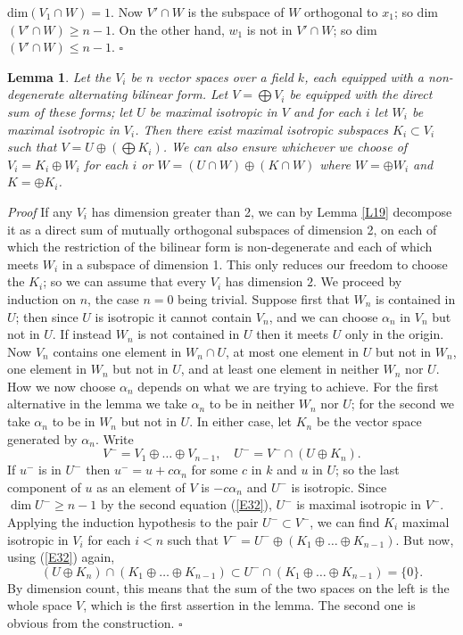 \documentclass[12pt]{article}
\def\ga{{\alpha}}
\def\qed{{\hfill$\square$}}
\def\beq{\begin{equation} \label}
\def\ble{\begin{lemma} \label}
\def\ele{\end{lemma}}
\newtheorem{lemma}{Lemma}
\begin{document}
dim$(V_1\cap W)=1$. Now $V'\cap W$ is the subspace of $W$ orthogonal to $x_1$;
so dim$(V'\cap W)\geq n-1$. On the other hand, $w_1$ is not in $V'\cap W$; so
dim$(V'\cap W)\leq n-1$.  \qed
\ble{L10} Let the $V_i$ be $n$ vector spaces over a field $k$, each equipped
with a non-degenerate alternating bilinear form. Let $V=\bigoplus V_i$ be
equipped with the direct sum of these forms; let $U$ be maximal isotropic in
$V$ and for each $i$ let $W_i$ be maximal isotropic in $V_i$.
Then there exist maximal isotropic subspaces $K_i\subset V_i$ such that
$V=U\oplus(\bigoplus K_i)$. We can also ensure whichever we choose of
$V_i=K_i\oplus W_i$ for each $i$ or $W=(U\cap W)\oplus(K\cap W)$ where
$W=\oplus W_i$ and $K=\oplus K_i$.
\ele
\emph{Proof}
 If any $V_i$ has dimension greater than 2, we can by Lemma
\ref{L19} decompose it as a direct sum of mutually orthogonal subspaces of
dimension 2, on each of which the restriction of the
bilinear form is
non-degenerate and each of which meets $W_i$ in a subspace of
dimension 1. This only reduces our
freedom to choose the $K_i$; so
we can assume that every $V_i$ has dimension
$2$. We proceed by induction on $n$, the case $n=0$ being trivial. Suppose first that $W_n$ is contained in $U$; then since
$U$ is isotropic it cannot contain $V_n$, and we can choose
$\ga_n$ in $V_n$ but not in $U$. If instead $W_n$ is not
contained in $U$ then it meets $U$ only in the origin. Now
$V_n$ contains one element in $W_n\cap U$, at
most one element in $U$ but not in $W_n$, one element in
$W_n$ but not in $U$, and at least one element in neither
$W_n$ nor $U$. How we now choose $\ga_n$ depends on what we
are trying to achieve. For the first alternative in the lemma
we take $\ga_n$ to be in neither $W_n$ nor $U$; for the
second we take $\ga_n$ to be in $W_n$ but not in $U$.
In either case, let $K_n$ be the
vector space generated by $\ga_n$. Write
\beq{E32} V^-=V_1\oplus\ldots\oplus V_{n-1}, \quad U^-=V^-\cap(U\oplus K_n).
\end{equation}
If $u^-$ is in $U^-$ then $u^-=u+c\ga_n$ for some $c$ in $k$ and $u$ in $U$;
so the last component of $u$ as an element of $V$ is $-c\ga_n$ and $U^-$ is
isotropic. Since $\dim U^-\geq n-1$ by the second equation (\ref{E32}), $U^-$
is maximal isotropic in $V^-$. Applying the induction hypothesis to the pair
$U^-\subset V^-$, we can find $K_i$ maximal isotropic in $V_i$ for each $i<n$
such that $V^-=U^-\oplus(K_1\oplus\ldots\oplus K_{n-1})$. But now, using
(\ref{E32}) again,
\[ (U\oplus K_n)\cap(K_1\oplus\ldots\oplus K_{n-1})
\subset U^-\cap(K_1\oplus\ldots\oplus K_{n-1})=\{0\}. \]
By dimension count, this means that the sum of the two spaces
on the left is the whole space $V$, which is the first
assertion in the lemma. The second one is
obvious from the construction.  \qed
\end{document}
